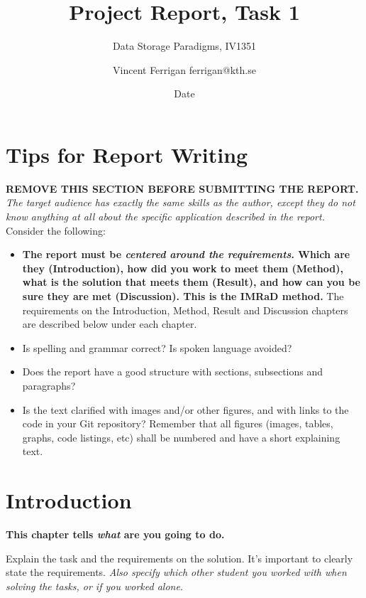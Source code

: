\documentclass[a4paper]{scrartcl}
\title{Project Report, Task 1}
\subtitle{Data Storage Paradigms, IV1351}
\author{Vincent Ferrigan ferrigan@kth.se}
\date{Date}
\begin{document}
\maketitle
    
\section*{Tips for Report Writing}
\textbf{REMOVE THIS SECTION BEFORE SUBMITTING THE REPORT.}\\

\noindent \textit{The target audience has exactly the same skills as the author, except they do not know anything at all about the specific application described in the report.} \\

Consider the following:

\begin{itemize}
  \item \textbf{The report must be \textit{centered around the requirements}. Which are they (Introduction), how did you work to meet them (Method), what is the solution that meets them (Result), and how can you be sure they are met (Discussion). This is the IMRaD method.} The requirements on the Introduction, Method, Result and Discussion chapters are described below under each chapter.

  \item Is spelling and grammar correct? Is spoken language avoided?

  \item Does the report have a good structure with sections, subsections and paragraphs?

  \item Is the text clarified with images and/or other figures, and with links to the code in your Git repository? Remember that all figures (images, tables, graphs, code listings, etc) shall be numbered and have a short explaining text.
\end{itemize}

\section{Introduction}

\textbf{This chapter tells \textit{what} are you going to do.} 

Explain the task and the requirements on the solution. It's important to clearly
state the requirements. \textit{Also specify which other student you worked with
when solving the tasks, or if you worked alone.} 
\end{document}
